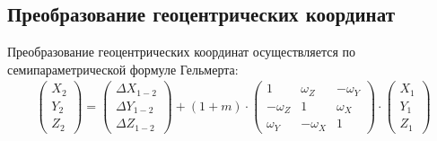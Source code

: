 \documentclass[12pt]{report}
\begin{document}
\subsection*{Преобразование геоцентрических координат}
Преобразование геоцентрических координат осуществляется по семипараметрической формуле Гельмерта:
\begin{eqnarray}
\begin{pmatrix}X_2\\Y_2\\Z_2\end{pmatrix}=
\begin{pmatrix}\Delta X_{1-2}\\\Delta Y_{1-2}\\ \Delta Z_{1-2}\end{pmatrix}+
(1 + m) \cdot
\begin{pmatrix}
1 & \omega_Z & - \omega_Y \\
- \omega_Z & 1 & \omega_X \\
\omega_Y & - \omega_X & 1
\end{pmatrix}
\cdot
\begin{pmatrix}
X_1
\\
Y_1
\\
Z_1
\end{pmatrix}
\end{eqnarray}
\end{document}
